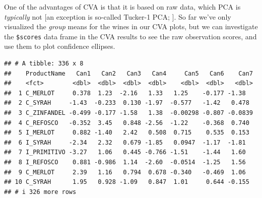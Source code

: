 \documentclass[
]{book}
\newenvironment{Shaded}{\begin{snugshade}}{\end{snugshade}}
\newcommand{\FunctionTok}[1]{\textcolor[rgb]{0.13,0.29,0.53}{\textbf{#1}}}
\newcommand{\NormalTok}[1]{#1}
\newcommand{\SpecialCharTok}[1]{\textcolor[rgb]{0.81,0.36,0.00}{\textbf{#1}}}
\begin{document}
One of the advantages of CVA is that it is based on raw data, which PCA is \emph{typically} not {[}an exception is so-called Tucker-1 PCA; \citet{dettmarPrincipal2020}{]}. So far we've only visualized the \emph{group} means for the wines in our CVA plots, but we can investigate the \texttt{\$scores} data frame in the CVA results to see the raw observation scores, and use them to plot confidence ellipses.

\begin{Shaded}
\end{Shaded}

\begin{verbatim}
## # A tibble: 336 x 8
##    ProductName   Can1   Can2   Can3   Can4     Can5   Can6    Can7
##    <fct>        <dbl>  <dbl>  <dbl>  <dbl>    <dbl>  <dbl>   <dbl>
##  1 C_MERLOT     0.378  1.23  -2.16   1.33   1.25    -0.177 -1.38  
##  2 C_SYRAH     -1.43  -0.233  0.130 -1.97  -0.577   -1.42   0.478 
##  3 C_ZINFANDEL -0.499 -0.177 -1.58   1.38  -0.00298 -0.807 -0.0839
##  4 C_REFOSCO   -0.352  3.45   0.848 -2.56  -1.22    -0.368  0.740 
##  5 I_MERLOT     0.882 -1.40   2.42   0.508  0.715    0.535  0.153 
##  6 I_SYRAH     -2.34   2.32   0.679 -1.85   0.0947  -1.17  -1.81  
##  7 I_PRIMITIVO -3.27   1.06   0.445 -0.766 -1.51    -1.44   1.60  
##  8 I_REFOSCO    0.881 -0.986  1.14  -2.60  -0.0514  -1.25   1.56  
##  9 C_MERLOT     2.39   1.16   0.794  0.678 -0.340   -0.469  1.06  
## 10 C_SYRAH      1.95   0.928 -1.09   0.847  1.01     0.644 -0.155 
## # i 326 more rows
\end{verbatim}

\begin{Shaded}
\end{Shaded}
\end{document}
